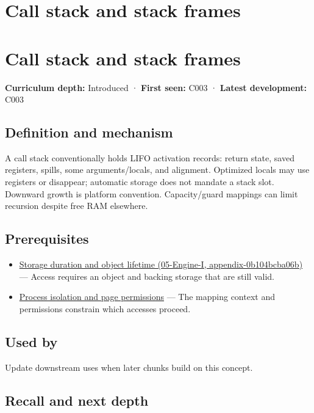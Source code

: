 \hypertarget{appendix-b081b7abe193}{}
\section*{Call stack and stack frames}
\section{Call stack and stack frames}\label{call-stack-and-stack-frames}

\textbf{Curriculum depth:} Introduced · \textbf{First seen:} C003 · \textbf{Latest development:} C003

\subsection{Definition and mechanism}\label{definition-and-mechanism}

A call stack conventionally holds LIFO activation records: return state, saved registers, spills, some arguments/locals, and alignment. Optimized locals may use registers or disappear; automatic storage does not mandate a stack slot. Downward growth is platform convention. Capacity/guard mappings can limit recursion despite free RAM elsewhere.

\subsection{Prerequisites}\label{prerequisites}

\begin{itemize}
\tightlist
\item
  \href{}{Storage duration and object lifetime (05-Engine-I, appendix-0b104bcba06b)} --- Access requires an object and backing storage that are still valid.
\item
  \hyperref[appendix-c2a9ad1e2b49]{Process isolation and page permissions} --- The mapping context and permissions constrain which accesses proceed.
\end{itemize}

\subsection{Used by}\label{used-by}

Update downstream uses when later chunks build on this concept.

\subsection{Recall and next depth}\label{recall-and-next-depth}

